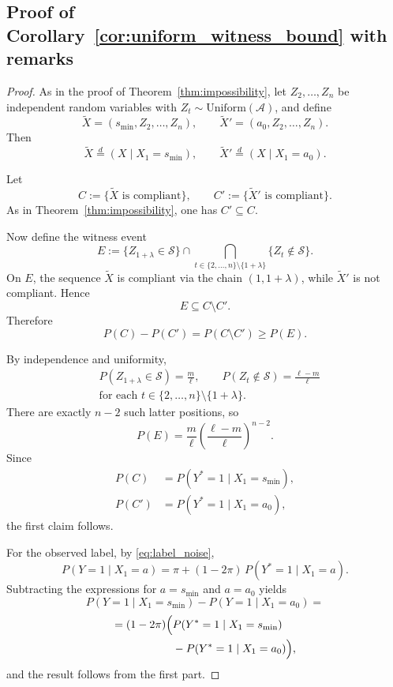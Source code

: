 \documentclass[fullpaper]{nldl}
\theoremstyle{plain}
\theoremstyle{definition}
\theoremstyle{remark}
\begin{document}
\subsection{Proof of Corollary~\ref{cor:uniform_witness_bound} with remarks}
\label{appendix:proof_uniform_witness_bound}
\begin{proof}
As in the proof of Theorem~\ref{thm:impossibility}, let
$Z_2,\ldots,Z_n$ be independent random variables with
$Z_t\sim \mathrm{Uniform}(\mathcal{A})$, and define
\[
\widetilde X=(s_{\min},Z_2,\ldots,Z_n),
\qquad
\widetilde X'=(a_0,Z_2,\ldots,Z_n).
\]
Then
\[
\widetilde X \stackrel{d}{=} (X\mid X_1=s_{\min}),
\qquad
\widetilde X' \stackrel{d}{=} (X\mid X_1=a_0).
\]

Let
\[
C:=\{\widetilde X \text{ is compliant}\},
\qquad
C':=\{\widetilde X' \text{ is compliant}\}.
\]
As in Theorem~\ref{thm:impossibility}, one has $C'\subseteq C$.

Now define the witness event
\[
E
:=
\{Z_{1+\lambda}\in\mathcal{S}\}
\cap
\bigcap_{t\in\{2,\ldots,n\}\setminus\{1+\lambda\}}
\{Z_t\notin\mathcal{S}\}.
\]
On $E$, the sequence $\widetilde X$ is compliant via the chain
$(1,1+\lambda)$, while $\widetilde X'$ is not compliant. Hence
\[
E \subseteq C\setminus C'.
\]
Therefore
\[
P(C)-P(C') = P(C\setminus C') \ge P(E).
\]

By independence and uniformity,
\[
\begin{aligned}
&P(Z_{1+\lambda}\in\mathcal{S})=\frac{m}{\ell},
\qquad
P(Z_t\notin\mathcal{S})=\frac{\ell-m}{\ell}\\
&\text{for each } t\in\{2,\ldots,n\}\setminus\{1+\lambda\}.
\end{aligned}
\]
There are exactly $n-2$ such latter positions, so
\[
P(E)
=
\frac{m}{\ell}\left(\frac{\ell-m}{\ell}\right)^{n-2}.
\]
Since
\[
\begin{aligned}
P(C)&=P(Y^*=1\mid X_1=s_{\min}),\\
P(C')&=P(Y^*=1\mid X_1=a_0),
\end{aligned}
\]
the first claim follows.

For the observed label, by \eqref{eq:label_noise},
\[
P(Y=1\mid X_1=a)
=
\pi + (1-2\pi)\,P(Y^*=1\mid X_1=a).
\]
Subtracting the expressions for $a=s_{\min}$ and $a=a_0$ yields
\[
P(Y=1\mid X_1=s_{\min})
-
P(Y=1\mid X_1=a_0)
=
\]
\[
\begin{aligned}
= (1-2\pi)\Bigl(
&P(Y^*=1\mid X_1=s_{\min})\\
&-
P(Y^*=1\mid X_1=a_0)
\Bigr),
\end{aligned}
\]
and the result follows from the first part.
\end{proof}
\end{document}
